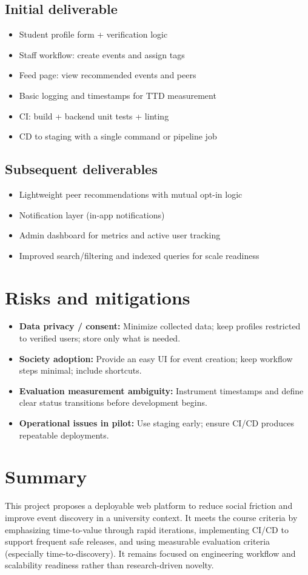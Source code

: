 \documentclass[12pt, a4paper]{article}
\begin{document}
\subsection{Initial deliverable} 
\begin{itemize}
    \item Student profile form + verification logic
    \item Staff workflow: create events and assign tags
    \item Feed page: view recommended events and peers
    \item Basic logging and timestamps for TTD measurement
    \item CI: build + backend unit tests + linting
    \item CD to staging with a single command or pipeline job
\end{itemize}

\subsection{Subsequent deliverables} 
\begin{itemize}
    \item Lightweight peer recommendations with mutual opt-in logic
    \item Notification layer (in-app notifications)
    \item Admin dashboard for metrics and active user tracking
    \item Improved search/filtering and indexed queries for scale readiness
\end{itemize}

\section{Risks and mitigations} 
\begin{itemize}
    \item \textbf{Data privacy / consent:} Minimize collected data; keep profiles restricted to verified users; store only what is needed.
    \item \textbf{Society adoption:} Provide an easy UI for event creation; keep workflow steps minimal; include shortcuts.
    \item \textbf{Evaluation measurement ambiguity:} Instrument timestamps and define clear status transitions before development begins.
    \item \textbf{Operational issues in pilot:} Use staging early; ensure CI/CD produces repeatable deployments.
\end{itemize}

\section{Summary} 
This project proposes a deployable web platform to reduce social friction and improve event discovery in a university context. It meets the course criteria by emphasizing time-to-value through rapid iterations, implementing CI/CD to support frequent safe releases, and using measurable evaluation criteria (especially time-to-discovery). It remains focused on engineering workflow and scalability readiness rather than research-driven novelty.
\end{document}

